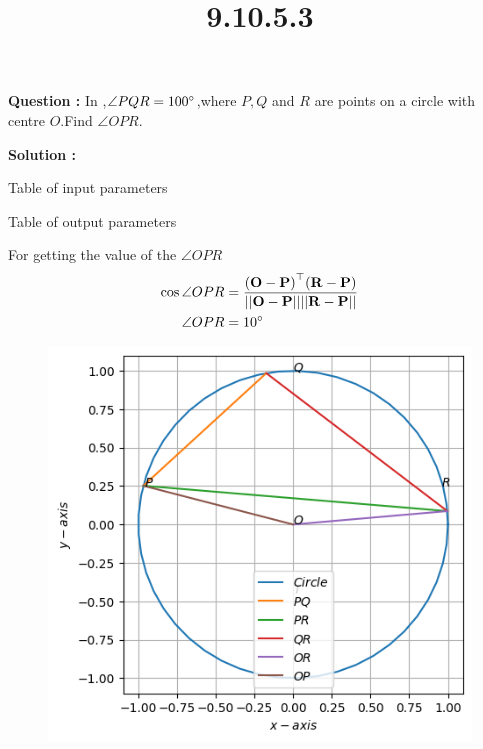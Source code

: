 \documentclass[12pt]{article}
\let\vec\mathbf
\providecommand{\brak}[1]{\ensuremath{\left(#1\right)}}
\providecommand{\norm}[1]{\ensuremath{\lvert|#1\rvert|}}
\begin{document}
\title{\textbf{9.10.5.3}}
\date{}
\maketitle
\textbf{Question :} In  ,$\angle PQR = 100\degree$,where $P,Q$ and $R$ are points on a circle with centre $O$.Find $\angle OPR$.

\textbf{Solution :}
\begin{table}[H]
    \centering
    
    \caption{Table of input parameters}
    \label{tab:tab:1}
\end{table}

\begin{table}[H]
    \centering
    
    \caption{Table of output parameters}
    \label{tab:tab:2}
\end{table}
For getting the value of the $\angle OPR$
\begin{align}
    \cos{\angle OPR }&= \frac{\vec{\brak{O-P}}^{\top}\vec{\brak{R-P}}}{\vec{\norm{O-P}\norm{R-P}}}\\
    \angle OPR &= 10\degree
  \end{align}

  \begin{figure}[H]                                 
	  \centering                          
	  \includegraphics[width=\columnwidth]{fig/9.10.5.3.png}
\caption{}
\label{9.10.5.3}                        
  \end{figure}
\end{document}
